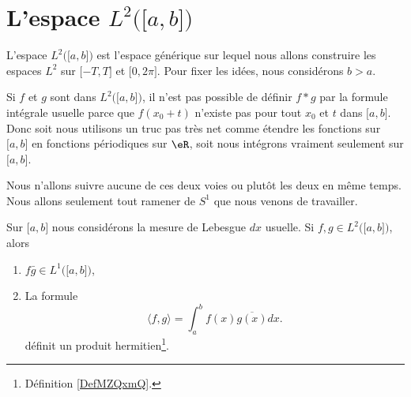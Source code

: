 \section{L'espace \( L^2\big( \mathopen[ a , b \mathclose] \big)\)}

L'espace \( L^2\big( \mathopen[ a , b \mathclose] \big)\) est l'espace générique sur lequel nous allons construire les espaces \( L^2\) sur \( \mathopen[ -T , T \mathclose]\) et \( \mathopen[ 0 , 2\pi \mathclose]\). Pour fixer les idées, nous considérons \( b>a\).

Si \( f\) et \( g\) sont dans \( L^2\big( \mathopen[ a , b \mathclose] \big)\), il n'est pas possible de définir \( f*g\) par la formule intégrale usuelle parce que \( f(x_0+t)\) n'existe pas pour tout \( x_0\) et \( t\) dans \( \mathopen[ a , b \mathclose]\). Donc soit nous utilisons un truc pas très net comme étendre les fonctions sur \( \mathopen[ a , b \mathclose]\) en fonctions périodiques sur \( \eR\), soit nous intégrons vraiment seulement sur \( \mathopen[ a , b \mathclose]\).

Nous n'allons suivre aucune de ces deux voies ou plutôt les deux en même temps. Nous allons seulement tout ramener de \( S^1\) que nous venons de travailler.

\begin{propositionDef}
	Sur \( \mathopen[ a , b \mathclose]\) nous considérons la mesure de Lebesgue \( dx\) usuelle. Si \( f,g\in L^2\big( \mathopen[ a , b \mathclose] \big)\), alors
	\begin{enumerate}
		\item
		      \( f\bar g\in L^1\big( \mathopen[ a , b \mathclose] \big)\),
		\item
		      La formule
		      \begin{equation}    \label{EQooCRSXooPEopzm}
			      \langle f, g\rangle =\int_a^bf(x)\overline{ g(x) }dx.
		      \end{equation}
		      définit un produit hermitien\footnote{Définition \ref{DefMZQxmQ}.}.
	\end{enumerate}
\end{propositionDef}

